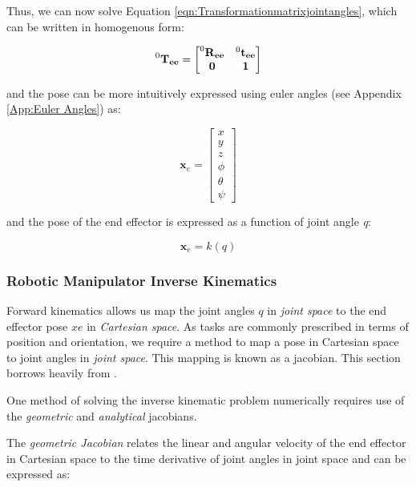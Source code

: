 \documentclass{UoNMCHA}
\numberwithin{equation}{section}
\begin{document}
Thus, we can now solve Equation \ref{eqn:Transformationmatrixjointangles}, which can be written in homogenous form:

\begin{equation}
\mathbf{\prescript{0}{}T_{ee}}=
\begin{bmatrix}
	\mathbf{\prescript{0}{}R_{ee}} &  \mathbf{\prescript{0}{}t_{ee}} \\
	\mathbf{0}      & \mathbf{1} 
\end{bmatrix}
\end{equation} 

and the pose can be more intuitively expressed using euler angles (see Appendix \ref{App:Euler Angles}) as:

\begin{equation}
\mathrm{\mathbf{x}}_e = 
\begin{bmatrix}
	x \\ y \\ z \\ \phi \\ \theta \\ \psi
\end{bmatrix}
\end{equation}

and the pose of the end effector is expressed as a function of joint angle \textit{q}:

\begin{equation}
	\mathrm{\mathbf{x}}_{e} = k(q)
\end{equation}

\subsubsection{Robotic Manipulator Inverse Kinematics}\label{Robotic Manipulator Inverse Kinematics}

Forward kinematics allows us map the joint angles $q$ in \textit{joint space} to the end effector pose $xe$ in \textit{Cartesian space}. As tasks are commonly prescribed in terms of position and orientation, we require a method to map a pose in Cartesian space to joint angles in \textit{joint space}. This mapping is known as a jacobian. This section borrows heavily from \cite{RentonDifferentialKinematics}. \

One method of solving the inverse kinematic problem numerically requires use of the \textit{geometric} and \textit{analytical} jacobians.\

The \textit{geometric Jacobian} relates the linear and angular velocity of the end effector in Cartesian space to the time derivative of joint angles in joint space and can be expressed as:
\end{document}
